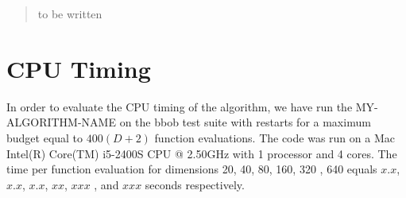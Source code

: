\documentclass{sig-alternate}
\newcommand{\change}[1]{{\color{red} #1}}
\begin{document}

\maketitle
\begin{abstract}
to be written
\end{abstract}




%
%
%
\section{CPU Timing}
In order to evaluate the CPU timing of the algorithm, we have run the \change{MY-ALGORITHM-NAME} on the  \change{bbob test suite \cite{hansen2009fun}} with restarts for a maximum budget equal to \change{$400 (D + 2)$} function evaluations. The code was run on a \change{Mac Intel(R) Core(TM) i5-2400S CPU @ 2.50GHz} with \change{1} processor and \change{4} cores. The time per function evaluation for dimensions 20, 40, 80, 160, 320\change{, 640} equals \change{$x.x$}, \change{$x.x$}, \change{$x.x$}, \change{$xx$}, \change{$xxx$}\change{, and $xxx$} seconds respectively. 
\end{document}
